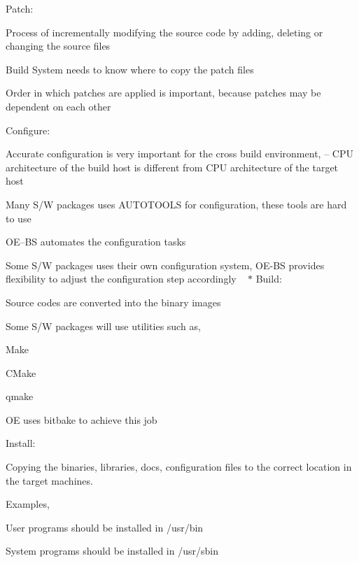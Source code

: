 \begin{DoxyItemize}
\begin{DoxyItemize}
\end{DoxyItemize}
\item Patch\+:
\begin{DoxyItemize}
\item Process of incrementally modifying the source code by adding, deleting or changing the source files
\item Build System needs to know where to copy the patch files
\item Order in which patches are applied is important, because patches may be dependent on each other
\end{DoxyItemize}
\item Configure\+:
\begin{DoxyItemize}
\item Accurate configuration is very important for the cross build environment, – C\+PU architecture of the build host is different from C\+PU architecture of the target host
\item Many S/W packages uses A\+U\+T\+O\+T\+O\+O\+LS for configuration, these tools are hard to use
\item O\+E–\+BS automates the configuration tasks
\item Some S/W packages uses their own configuration system, O\+E-\/\+BS provides flexibility to adjust the configuration step accordingly ~\newline
$\ast$ Build\+:
\item Source codes are converted into the binary images
\item Some S/W packages will use utilities such as,
\begin{DoxyItemize}
\item Make
\item C\+Make
\item qmake
\end{DoxyItemize}
\item OE uses bitbake to achieve this job
\end{DoxyItemize}
\item Install\+:
\begin{DoxyItemize}
\item Copying the binaries, libraries, docs, configuration files to the correct location in the target machines.
\item Examples,
\begin{DoxyItemize}
\item User programs should be installed in /usr/bin
\item System programs should be installed in /usr/sbin

\end{DoxyItemize}
\end{DoxyItemize}
\end{DoxyItemize}
